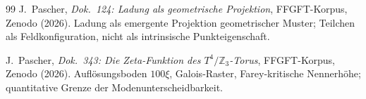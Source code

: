 \begin{thebibliography}{99}
J.~Pascher,
\textit{Dok.~124: Ladung als geometrische Projektion},
FFGFT-Korpus, Zenodo (2026).
Ladung als emergente Projektion geometrischer Muster; Teilchen als
Feldkonfiguration, nicht als intrinsische Punkteigenschaft.

J.~Pascher,
\textit{Dok.~343: Die Zeta-Funktion des $T^4/\mathbb{Z}_3$-Torus},
FFGFT-Korpus, Zenodo (2026).
Auflösungsboden $100\xi$, Galois-Raster, Farey-kritische Nennerhöhe;
quantitative Grenze der Modenunterscheidbarkeit.

\end{thebibliography}
